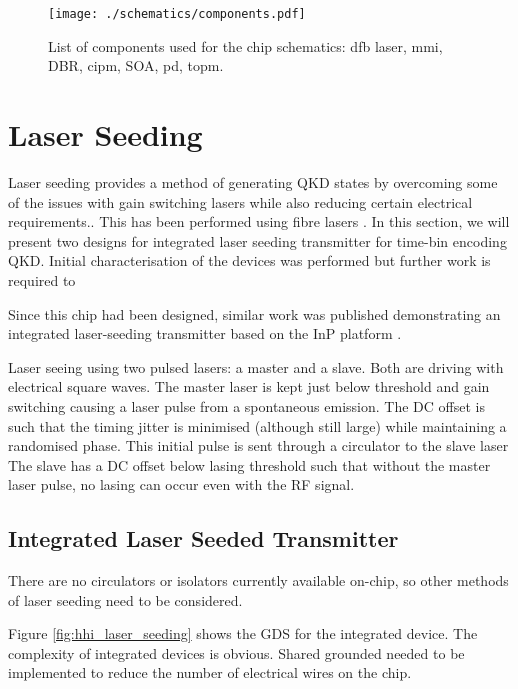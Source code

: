 
\begin{figure}
	\centering
	\texttt{[image: ./schematics/components.pdf]}
	\caption[Components used for chip schematics]{List of components used for the chip schematics: \acf{dfb} laser, \acf{mmi}, \acf{DBR}, \acf{cipm}, \acf{SOA}, \acf{pd}, \acf{topm}.}
	\label{fig:components}
\end{figure}

\section{Laser Seeding}

Laser seeding provides a method of generating \ac{QKD} states by overcoming some of the issues with gain switching lasers while also reducing certain electrical requirements.. This has been performed using fibre lasers \cite{Comandar2016PLS, Comandar2016}. In this section, we will present two designs for integrated laser seeding transmitter for time-bin encoding \ac{QKD}. Initial characterisation of the devices was performed but further work is required to 

Since this chip had been designed, similar work was published demonstrating an integrated laser-seeding transmitter based on the \ac{InP} platform \cite{paraiso2019}. 

Laser seeing using two pulsed lasers: a master and a slave. Both are driving with electrical square waves. The master laser is kept just below threshold and gain switching causing a laser pulse from a spontaneous emission. The DC offset is such that the timing jitter is minimised (although still large) while maintaining a randomised phase. This initial pulse is sent through a circulator to the slave laser The slave has a DC offset below lasing threshold such that without the master laser pulse, no lasing can occur even with the RF signal.

\subsection{Integrated Laser Seeded Transmitter}

There are no circulators or isolators currently available on-chip, so other methods of laser seeding need to be considered.

Figure \ref{fig:hhi_laser_seeding} shows the GDS for the integrated device. The complexity of integrated devices is obvious. Shared grounded needed to be implemented to reduce the number of electrical wires on the chip.

